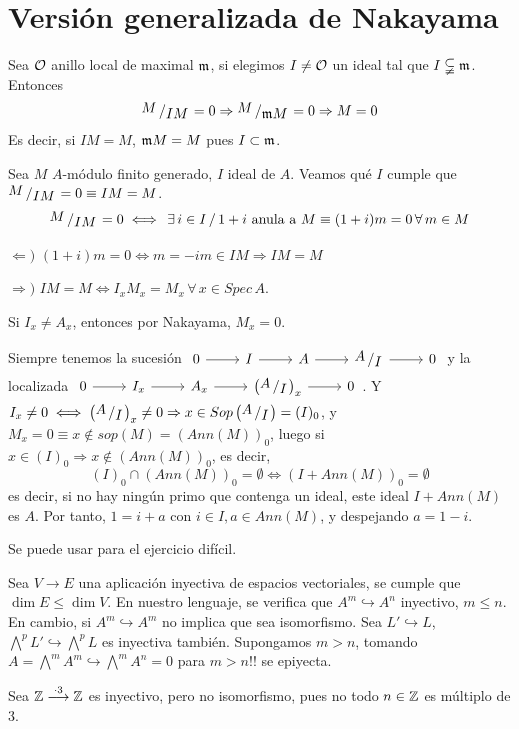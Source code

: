 \section{Versi\'on generalizada de Nakayama}
Sea $\mathcal{O}$ anillo local de maximal $\mathfrak{m}$, si elegimos $I \neq \mathcal{O}$ un ideal tal que $I \subsetneqq \mathfrak{m}$. Entonces
$$\modulo{M}{IM} = 0 \Rightarrow \modulo{M}{\m M} = 0 \Rightarrow M=0$$
Es decir, si $IM = M $, $\mathfrak{m} M = M$ pues $I \subset \mathfrak{m}$.

\begin{ejer}
    Sea $M$ $A$-m\'odulo finito generado, $I$ ideal de $A$. Veamos qu\'e $I$ cumple que $\modulo{M}{IM} = 0 \equiv IM = M$. 
    $$\modulo{M}{IM} = 0 \iff \, \exists \, i \in I \, /\, 1+i \text{ anula a } M \equiv (1+i)m = 0\,  \forall \, m \in M$$
\end{ejer}
\begin{sol}
    $\Leftarrow)$ $(1+i)m = 0 \iff m = -im \in IM \Rightarrow IM = M$

    $\Rightarrow)$ $IM = M\iff I_x M_x = M_x \, \forall \, x \in Spec \, A$. 

    Si $I_x \neq A_x$, entonces por Nakayama, $M_x = 0$. 

    Siempre tenemos la sucesi\'on $\bt 0 \arrow{r} & I  \arrow{r} & A  \arrow{r} & \modulo{A}{I}  \arrow{r} & 0 \et$ y la localizada $\bt 0 \arrow{r} & I_x  \arrow{r} & A_x  \arrow{r} & \left(\modulo{A}{I}\right)_x  \arrow{r} & 0\et $. Y $I_x \neq 0 \iff \left(\modulo{A}{I}\right)_x \neq 0 \Rightarrow x \in Sop\left(\modulo{A}{I}\right) = (I)_0$, y $M_x = 0 \equiv x \nin sop(M) = (Ann(M))_0$, luego si $x \in  (I)_0 \Rightarrow x\nin (Ann(M))_0$, es decir, 
    $$(I)_0 \cap (Ann(M))_0 = \emptyset \iff (I + Ann(M))_0 = \emptyset$$
    es decir, si no hay ning\'un primo que contenga un ideal, este ideal $I + Ann(M)$ es $A$. Por tanto, $1 = i+a$ con $i \in I, a\in Ann(M)$, y despejando $a=1-i$. 
\end{sol}
Se puede usar para el ejercicio dif\'icil.

\begin{ejer}
     Sea $V \longrightarrow E$ una aplicaci\'on inyectiva de espacios vectoriales, 
    se cumple que $\dim E \leq \dim V$. En nuestro lenguaje, se verifica que $A^m \hookrightarrow A^n$ inyectivo, $m \leq n$. En cambio, si $A^m \hookrightarrow A^m$ no implica que sea isomorfismo. Sea $L'\hookrightarrow L$, $\bigwedge^p L' \hookrightarrow \bigwedge^p L$ es inyectiva tambi\'en. Supongamos $m>n$, tomando $A = \bigwedge^m A^m \hookrightarrow \bigwedge^m A^n = 0$ para $m>n !!$ se epiyecta.
\end{ejer}
\begin{ejem}
    Sea $\mathbb{Z} \overset{\cdot 3}{\longrightarrow} \mathbb{Z}$ es inyectivo, pero no isomorfismo, pues no todo $n \in \mathbb{Z}$ es m\'ultiplo de 3. 
\end{ejem}

